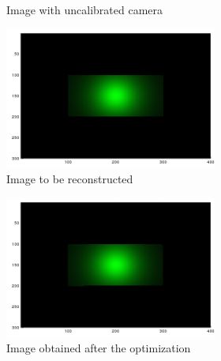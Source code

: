 \documentclass{juliacon}
\begin{document}
\begin{figure}[!htb]
\begin{subfigure}[c]{0.45\textwidth}
\begin{subfigure}[c]{0.45\textwidth}
            \caption{Image with uncalibrated camera}
            \label{fig:cam_guess}
        \end{subfigure}
        \hfill
        \begin{subfigure}[c]{0.45\textwidth}
            \centering          
            \includegraphics[width=\textwidth]{images/camera/target_image.png}
            \caption{Image to be reconstructed}
            \label{fig:cam_target}
        \end{subfigure}
        \centering
        \hfill
        \begin{subfigure}[c]{0.45\textwidth}
            \centering
            \includegraphics[width=\textwidth]{images/camera/recon.png}
            \caption{Image obtained after the optimization}
        \end{subfigure}
        \hfill
        \begin{subfigure}[c]{0.45\textwidth}

\end{subfigure}
\end{subfigure}
\end{figure}
\end{document}
